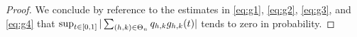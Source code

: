 \begin{proof}
\begin{comment}
$\Omega_q := \{\omega : \mu(\omega, \domain  \times \{\vert x \vert > 1\} ) \le q \}$, for     $q \in \nats$. It is easily seen that $\p(\Omega_q) \to 1$ as $q \to \infty$. Set $\Omega(n, q) := \Omega_n \cap \Omega_q$. Now note that   $\e(\gamma^3_i I_{\Omega(n,q)}) \le q \e(\djt I_{G^1_i}) \le c q \Delta_n^{3/2} u_n^{-1/2}$. So that given positive $\eta$,
\begin{align} 
  \p( \sup_{t \in \domain}&\vert \sumt \sumin \btghki \gamma^3_i \ghk(t)\vert > \eta) \notag \\ &\le \p(\Omega(n,q)^c) + cqH^n (u^{-1}_n\Delta_n)^{1/2}, \notag \end{align}
which can be made arbitrarily small by  choosing $n,q$ large enough and letting $n \to \infty$.  Similarly note that $\e(\gamma^4_i I_{\Omega(n,q)}) \le q \e(\djt I_{G^2_i}) \le c q \Delta_n u_n^{-1/4}$. So that 
\begin{align} 
  \p( \sup_{t \in \domain}\vert \sumt \sumin \btghki \gamma^4_i \ghk(t)\vert > \eta) \le \p(\Omega(n,q)^c) + cqH^n u^{-1/4}_n\Delta_n, \notag \end{align}
which can be made as small as desired. This completes the demonstration  that 
\begin{align}
  \p(\sup_{t \in \domain} \vert \sumt q_{h,k} \ghk(t) \vert > \eta) \to 0.\notag
  \label{}
\end{align}
Now, arguing as in Theorem 4.1 of \cite{Mancini2009}, note that on $ A_i \cap C_i^c$, it is the case that  $2u_n^{1/2} - \vert \dxf \vert < \vert \djt\vert - \vert \dxf\vert \le \vert \dx \vert \le u_n^{1/2}$, so that $u_n^{1/2} < \vert \dxf \vert < \vert \djl \vert + \vert \dxc \vert $. In turn, the last inequality implies that either $\vert \djl \vert > u^{1/2}_n/2$ or  $\vert \dxc \vert > u^{1/2}_n/2$. Now, for sufficiently large $n$, it is almost surely never the case that $\vert \dxc \vert > u^{1/2}_n/2$ for some $i$,  $0 \le  i  \le n -1$. Hence,  for positive $\delta$, \begin{align} \p(\vert&\sumt q_{h,k} \ghk(t) \vert > \delta/2) \notag \\ &\le \p(    \cup_i\{ \mu( (t_i, t_{i+1}] \times \{\vert x \vert > 1 \} ) > 0,  (\djt)^2 > u_n\}) \notag \\ & \le c n^{-1} \kappa u_n^{-1}.\end{align}
\end{comment}
We conclude by  reference to the estimates in \eqref{eq:g1}, \eqref{eq:g2}, \eqref{eq:g3}, and \eqref{eq:g4} that  $\sup_{t \in [0,1]} \vert \sum_{(h,k) \in \Theta_n} q_{h,k} g_{h,k} (t) \vert $ tends to zero in probability.


\end{proof}
